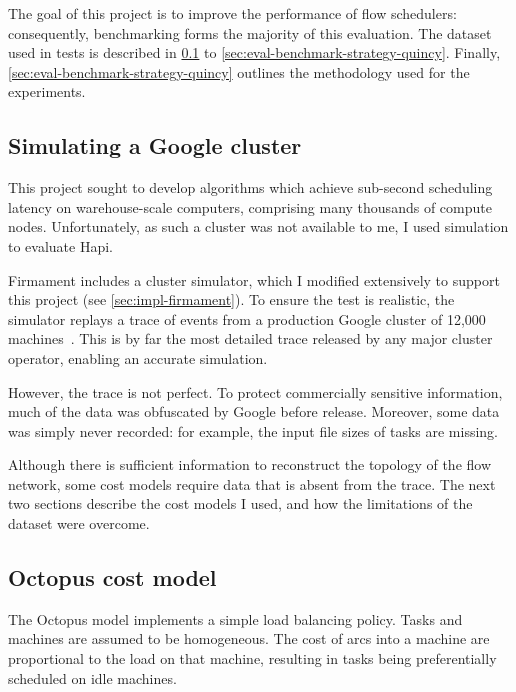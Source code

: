 The goal of this project is to improve the performance of flow schedulers: consequently, benchmarking forms the majority of this evaluation. The dataset used in tests is described in \cref{sec:eval-benchmark-strategy-simulation} to \cref{sec:eval-benchmark-strategy-quincy}. Finally, \cref{sec:eval-benchmark-strategy-quincy} outlines the methodology used for the experiments.

\subsection{Simulating a Google cluster} \label{sec:eval-benchmark-strategy-simulation}

This project sought to develop algorithms which achieve sub-second scheduling latency on warehouse-scale computers, comprising many thousands of compute nodes. Unfortunately, as such a cluster was not available to me, I used simulation to evaluate Hapi.

Firmament includes a cluster simulator, which I modified extensively to support this project (see \cref{sec:impl-firmament}). To ensure the test is realistic, the simulator replays a trace of events from a production Google cluster of 12,000 machines~\cite{clusterdata:Wilkes2011,clusterdata:Reiss2011,Reiss:2012}. This is by far the most detailed trace released by any major cluster operator, enabling an accurate simulation.

However, the trace is not perfect. To protect commercially sensitive information, much of the data was obfuscated by Google before release. Moreover, some data was simply never recorded: for example, the input file sizes of tasks are missing. 

Although there is sufficient information to reconstruct the topology of the flow network, some cost models require data that is absent from the trace. The next two sections describe the cost models I used, and how the limitations of the dataset were overcome.

\subsection{Octopus cost model} \label{sec:eval-benchmark-strategy-octopus}

The Octopus model implements a simple load balancing policy. Tasks and machines are assumed to be homogeneous. The cost of arcs into a machine are proportional to the load on that machine, resulting in tasks being preferentially scheduled on idle machines. 

